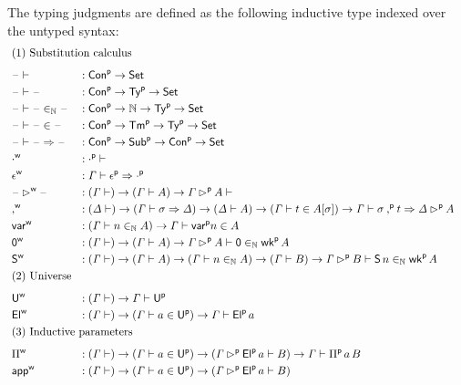 \begin{definition}\label{def:typing_judgments}
  The typing judgments are defined as the following inductive type indexed over the
  untyped syntax:
\begin{alignat*}{5}
  & \rlap{(1) Substitution calculus} \\[0.5em]
  & \blank \vdash && : \Conu\ra \Set \\
  & \blank \vdash \blank  && : \Conu\ra \Tyu\ra\Set \\
  & \blank \vdash \blank \invar \blank  && : \Conu\ra \N \ra \Tyu\ra \Set \\
  & \blank \vdash \blank \in \blank  && : \Conu\ra \Tmu\ra \Tyu\ra \Set \\
  & \blank \vdash \blank \Rightarrow \blank  && : \Conu\ra \Subu \ra \Conu\ra \Set \\
  & \emptyw && : \emptyu \vdash \\
  & \epsilonw && : \GG\vdash \epsilonu \Rightarrow \emptyu \\
  & \blank\extw\blank && : ( \GG\vdash )  \ra  (\GG\vdash A)  \ra
  \GG\extu A \vdash \\
  & \consw && :
    (\GD \vdash) \ra
    (\GG\vdash \sigma \Rightarrow\GD)\ra
    ( \GD \vdash A) \ra
    ( \GG \vdash t \in A[\sigma]) \ra
    \GG \vdash \sigma\consu t \Rightarrow \GD\extu A
   \\
  & \varw  && : (\GG \vdash n \invar A) \ra \GG \vdash \varu n \in A \\
  & \vzw  && : (\GG\vdash)\ra(\GG\vdash A)\ra\GG \extu  A \vdash \mathsf{0} \invar \wku \, A \\
  & \vsw  && : (\GG\vdash)\ra(\GG\vdash A)\ra(\GG \vdash n \invar A) \ra (\GG \vdash B) \ra \GG \extu  B
  \vdash \mathsf{S}\,n \invar \wku \, A \\
  & \rlap{(2) Universe} \\[0.5em]
  & \Uw && : (\GG \vdash)\ra \GG \vdash \Uu \\
  & \Elw && : (\GG \vdash)\ra (\GG \vdash a \in \Uu)\ra\GG \vdash \Elu\,a \\
  & \rlap{(3) Inductive parameters} \\[0.5em]
\  & \Piw && :
    (\GG \vdash)\ra (\GG \vdash a \in \Uu)\ra(\GG \extu
  \Elu\,a \vdash B)\ra\GG \vdash \Piu \, a \, B \\
  & \appw && :
    (\GG \vdash)\ra (\GG \vdash a \in \Uu)\ra(\GG \extu
    \Elu\,a \vdash B)
    \\

\end{alignat*}
\end{definition}
